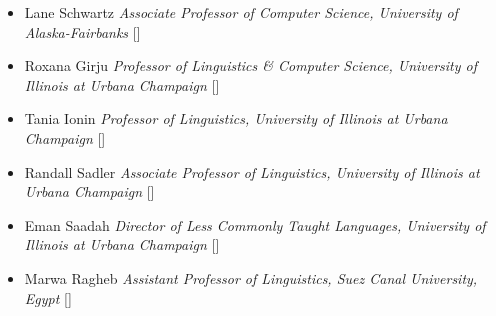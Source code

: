 
\begin{referees}
\course
	{\begin{itemize}
	
	\item {Lane Schwartz} \dotfill \emph{Associate Professor of Computer Science, University of Alaska-Fairbanks}  [\href{http://dowobeha.github.io/about/}{\small{\websiteSymbol}}]
	
	\item {Roxana Girju} \dotfill \emph{Professor of Linguistics \& Computer Science,  University of Illinois at Urbana Champaign} [\href{https://experts.illinois.edu/en/persons/corina-r-girju}{\small{\websiteSymbol}}]
	
	\item {Tania Ionin} \dotfill \emph{Professor of Linguistics, University of Illinois at Urbana Champaign} [\href{https://linguistics.illinois.edu/directory/profile/tionin}{\small{\websiteSymbol}}]
	
	\item {Randall Sadler} \dotfill \emph{Associate Professor of Linguistics, University of Illinois at Urbana Champaign} [\href{https://linguistics.illinois.edu/directory/profile/rsadler}{\small{\websiteSymbol}}]
	

	
	\item {Eman Saadah}  \dotfill \emph{Director of Less Commonly Taught Languages, University of Illinois at Urbana Champaign} [\href{https://linguistics.illinois.edu/directory/profile/esaadah2}{\small{\websiteSymbol}}]
    
    \item {Marwa Ragheb} \dotfill \emph{Assistant Professor of Linguistics, Suez Canal University, Egypt} [\href{https://www.linkedin.com/in/marwa-ragheb-90846844/}{\small{\websiteSymbol}}]
    
    \end{itemize}}
     
\end{referees}